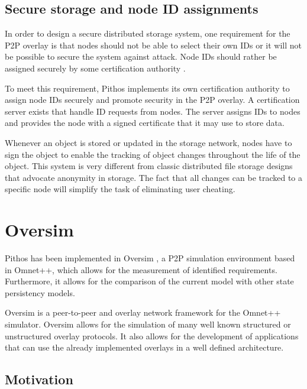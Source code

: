 \subsection{Secure storage and node ID assignments}
\label{secure_ids}

In order to design a secure distributed storage system, one requirement for the P2P overlay is that nodes should not be able to select their own IDs
or it will not be possible to secure the system against attack. Node IDs should rather be assigned securely by some certification authority
\cite{secure_overlay_routing}.

To meet this requirement, Pithos implements its own certification authority to assign node IDs securely and promote security in the P2P overlay. A
certification server exists that handle ID requests from nodes. The server assigns IDs to nodes and provides the node with a signed certificate that
it may use to store data.

Whenever an object is stored or updated in the storage network, nodes have to sign the object to enable the tracking of object changes throughout the
life of the object. This system is very different from classic distributed file storage designs that advocate anonymity in storage. The fact that all
changes can be tracked to a specific node will simplify the task of eliminating user cheating.

\section{Oversim}

Pithos has been implemented in Oversim \cite{OverSim_2007}, a P2P simulation environment based in Omnet++, which allows for the measurement of identified requirements. Furthermore, it allows for the comparison of the current model with other state persistency models.

Oversim is a peer-to-peer and overlay network framework for the Omnet++ simulator. Oversim allows for the simulation of many well known structured or unstructured overlay protocols. It also allows for the development of applications that can use the already implemented overlays in a well defined architecture.


    \subsection{Motivation}


